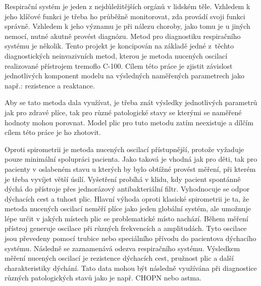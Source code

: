 Respirační systém je jeden z nejdůležitějších orgánů v lidském těle. Vzhledem k jeho klíčové funkci je třeba ho průběžně monitorovat, zda provádí svoji funkci správně. Vzhledem k jeho významu je při nálezu choroby, jako tomu je u jiných nemocí, nutné akutně provést diagnózu. 
Metod pro diagnostiku respiračního systému je několik. Tento projekt je koncipován na základě jedné z~těchto diagnostických neinvazivních metod, kterou je metoda nucených oscilací realizované přístrojem tremoflo C-100. Cílem této práce je zjistit závislost jednotlivých komponent modelu na výsledných naměřených parametrech jako např.: rezistence a reaktance. \cite{Vlcek2018}


Aby se tato metoda dala využívat, je třeba znát výsledky jednotlivých parametrů jak pro zdravé plíce, tak pro různé patologické stavy se kterými se naměřené hodnoty mohou porovnat. Model plic pro tuto metodu zatím neexistuje a dílčím cílem této práce je ho zhotovit. 


Oproti spirometrii je metoda nucených oscilací přístupnější, protože vyžaduje pouze minimální spolupráci pacienta. Jako taková je vhodná jak pro děti, tak pro pacienty v oslabeném stavu u kterých by bylo obtížné provést měření, při kterém je třeba vyvíjet větší úsilí. \cite{Vlcek2018} Vyšetření probíhá v klidu, kdy pacient spontánně dýchá do přístroje přes jednorázový antibakteriální filtr. Vyhodnocuje se odpor dýchacích cest a tuhost plic. \cite{Vlcek2018}
Hlavní výhoda oproti klasické spirometrii je ta, že metoda nucených oscilací neměří plíce jako jeden globální systém, ale umožnuje lépe určit v jakých místech plic se problematické místo nachází. \cite{Vlcek2018}
Během měření přístroj generuje oscilace při různých frekvencích a amplitudách. Tyto oscilace jsou převedeny pomocí trubice nebo speciálního přívodu do pacientova dýchacího systému. Následně se zaznamenává odezva respiračního systému. Výsledkem měření nucených oscilací je rezistence dýchacích cest, pružnost plic a další charakteristiky dýchání. Tato data mohou být následně využívána při diagnostice různých patologických stavů jako je např. CHOPN nebo astma. \cite{Vlcek2018}
